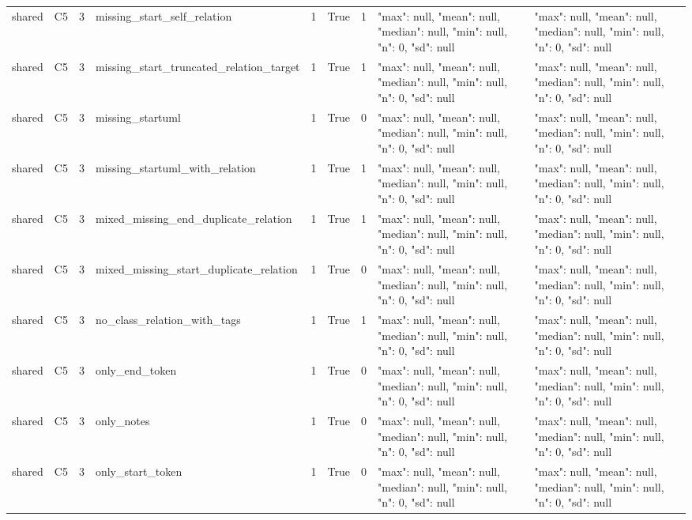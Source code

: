 \begin{tabular}{lllllllll}
shared & C5 & 3 & missing\_start\_self\_relation & 1 & True & 1 & {"max": null, "mean": null, "median": null, "min": null, "n": 0, "sd": null} & {"max": null, "mean": null, "median": null, "min": null, "n": 0, "sd": null} \\
shared & C5 & 3 & missing\_start\_truncated\_relation\_target & 1 & True & 1 & {"max": null, "mean": null, "median": null, "min": null, "n": 0, "sd": null} & {"max": null, "mean": null, "median": null, "min": null, "n": 0, "sd": null} \\
shared & C5 & 3 & missing\_startuml & 1 & True & 0 & {"max": null, "mean": null, "median": null, "min": null, "n": 0, "sd": null} & {"max": null, "mean": null, "median": null, "min": null, "n": 0, "sd": null} \\
shared & C5 & 3 & missing\_startuml\_with\_relation & 1 & True & 1 & {"max": null, "mean": null, "median": null, "min": null, "n": 0, "sd": null} & {"max": null, "mean": null, "median": null, "min": null, "n": 0, "sd": null} \\
shared & C5 & 3 & mixed\_missing\_end\_duplicate\_relation & 1 & True & 1 & {"max": null, "mean": null, "median": null, "min": null, "n": 0, "sd": null} & {"max": null, "mean": null, "median": null, "min": null, "n": 0, "sd": null} \\
shared & C5 & 3 & mixed\_missing\_start\_duplicate\_relation & 1 & True & 0 & {"max": null, "mean": null, "median": null, "min": null, "n": 0, "sd": null} & {"max": null, "mean": null, "median": null, "min": null, "n": 0, "sd": null} \\
shared & C5 & 3 & no\_class\_relation\_with\_tags & 1 & True & 1 & {"max": null, "mean": null, "median": null, "min": null, "n": 0, "sd": null} & {"max": null, "mean": null, "median": null, "min": null, "n": 0, "sd": null} \\
shared & C5 & 3 & only\_end\_token & 1 & True & 0 & {"max": null, "mean": null, "median": null, "min": null, "n": 0, "sd": null} & {"max": null, "mean": null, "median": null, "min": null, "n": 0, "sd": null} \\
shared & C5 & 3 & only\_notes & 1 & True & 0 & {"max": null, "mean": null, "median": null, "min": null, "n": 0, "sd": null} & {"max": null, "mean": null, "median": null, "min": null, "n": 0, "sd": null} \\
shared & C5 & 3 & only\_start\_token & 1 & True & 0 & {"max": null, "mean": null, "median": null, "min": null, "n": 0, "sd": null} & {"max": null, "mean": null, "median": null, "min": null, "n": 0, "sd": null} \\

\end{tabular}

